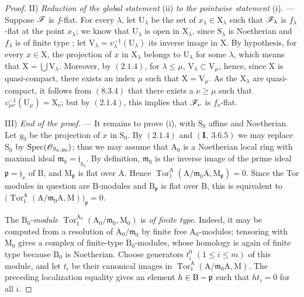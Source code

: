 \begin{proof}
\medskip
\noindent II) \emph{Reduction of the global statement} (ii) \emph{to the pointwise statement} (i). --- Suppose $\mathscr{F}$ is $f$-flat. For every $\lambda$, let $\mathrm{U}_\lambda$ be the set of $x_\lambda\in\mathrm{X}_\lambda$ such that $\mathscr{F}_\lambda$ is $f_\lambda$-flat at the point $x_\lambda$; we know that $\mathrm{U}_\lambda$ is open in $\mathrm{X}_\lambda$, since $\mathrm{S}_\lambda$ is Noetherian and $f_\lambda$ is of finite type ; let $\mathrm{V}_\lambda=v_\lambda^{-1}(\mathrm{U}_\lambda)$ its inverse image in $\mathrm{X}$. By hypothesis, for every $x\in\mathrm{X}$, the projection of $x$ in $\mathrm{X}_\lambda$ belongs to $\mathrm{U}_\lambda$ for some $\lambda$, which means that $\mathrm{X}=\bigcup\mathrm{V}_\lambda$. Moreover, by $(2.1.4)$, for $\lambda\leqslant\mu$, $\mathrm{V}_\lambda\subset\mathrm{V}_\mu$, hence, since $\mathrm{X}$ is quasi-compact, there exists an index $\mu$ such that $\mathrm{X}=\mathrm{V}_\mu$. As the $\mathrm{X}_\lambda$ are quasi-compact, it follows from $(8.3.4)$ that there exists a $\nu\geqslant\mu$ such that $v_{\mu\nu}^{-1}(\mathrm{U}_\mu)=\mathrm{X}_\nu$; but by $(2.1.4)$, this implies that $\mathscr{F}_\nu$ is $f_\nu$-flat.

\medskip
\noindent III) \emph{End of the proof.} --- It remains to prove
(i), with $\mathrm S_0$ affine and Noetherian. Let $y_0$ be the
projection of $x$ in $\mathrm S_0$. By $(2.1.4)$ and
$(\mathbf I,~3.6.5)$ we may replace $\mathrm S_0$ by
$\operatorname{Spec}(\mathscr{O}_{\mathrm S_0,y_0})$; thus we may assume that
$\mathrm A_0$ is a Noetherian local ring with maximal ideal
$\mathfrak m_0=\mathfrak j_{y_0}$. By definition,
$\mathfrak m_0$ is the inverse image of the prime ideal
$\mathfrak p=\mathfrak j_x$ of $\mathrm B$, and
$\mathrm M_{\mathfrak p}$ is flat over $\mathrm A$. Hence $\operatorname{Tor}_1^\mathrm A
(\mathrm A/\mathfrak m_0\mathrm A,\mathrm M_{\mathfrak p})=0$.
Since the Tor modules in question are $\mathrm B$-modules and
$\mathrm B_{\mathfrak p}$ is flat over $\mathrm B$, this is equivalent
to $\bigl(\operatorname{Tor}_1^\mathrm A
(\mathrm A/\mathfrak m_0\mathrm A,\mathrm M)\bigr)_{\mathfrak p}=0$.

The $\mathrm B_0$-\emph{module}
$\operatorname{Tor}_1^{\mathrm A_0}
(\mathrm A_0/\mathfrak m_0,\mathrm M_0)$ is \emph{of finite type}. Indeed, it
may be computed from a resolution of $\mathrm A_0/\mathfrak m_0$ by
finite free $\mathrm A_0$-modules; tensoring with $\mathrm M_0$ gives a
complex of finite-type $\mathrm B_0$-modules, whose homology is again
of finite type because $\mathrm B_0$ is Noetherian. Choose generators
$t_i^0$ $(1\leqslant i\leqslant m)$ of this module, and let $t_i$ be
their canonical images in
$\operatorname{Tor}_1^\mathrm A
(\mathrm A/\mathfrak m_0\mathrm A,\mathrm M)$. The preceding
localization equality gives an element
$h\in\mathrm B-\mathfrak p$ such that $ht_i=0$ for all $i$.


\end{proof}
